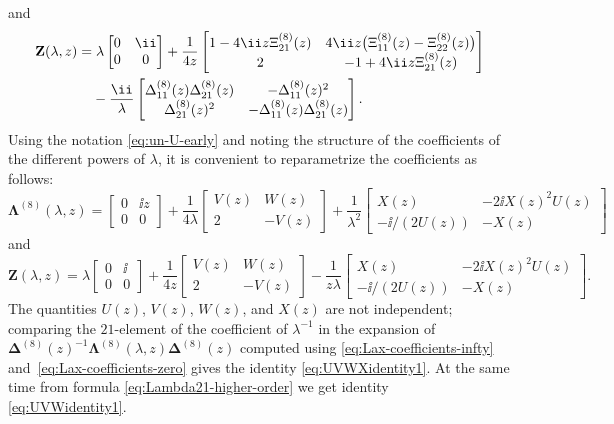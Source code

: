 and
\begin{align*}
 & \mathbf{Z}(\lambda,z)= \lambda\begin{bmatrix}0 & {\ii}{} \\0&0\end{bmatrix}+\frac{1}{4z}\begin{bmatrix}
 1-{4\ii z}{}\Xi^{(8)}_{21}(z) &{4\ii z}{}\big(\Xi^{(8)}_{11}(z)-\Xi^{(8)}_{22}(z)\big) \\2 & -1+{4\ii z}{}\Xi^{(8)}_{21}(z)
 \end{bmatrix} \\
 &\hphantom{\mathbf{Z}(\lambda,z)=}{} -
 \frac{\ii }{ \lambda}\begin{bmatrix}\Delta^{(8)}_{11}(z)\Delta^{(8)}_{21}(z) & -\Delta^{(8)}_{11}(z)^2 \\
 \Delta^{(8)}_{21}(z)^2 & -\Delta^{(8)}_{11}(z)\Delta^{(8)}_{21}(z)\end{bmatrix}.
\end{align*}
Using the notation \eqref{eq:un-U-early} and noting the structure of the coefficients of the different powers of $\lambda$, it is convenient to reparametrize the coefficients as follows:
\begin{equation*}
 \mathbf{\Lambda}^{(8)}(\lambda,z)=\begin{bmatrix}0&{\ii z}{} \\0&0\end{bmatrix} +\frac{1}{4\lambda}\begin{bmatrix}V(z) & W(z)\\2 & -V(z)\end{bmatrix} +\frac{1}{\lambda^2}\begin{bmatrix} X(z) & -2 \ii X(z)^2U(z)\\-\ii/(2U(z)) & -X(z)\end{bmatrix}
\end{equation*}
and
\begin{equation*} \mathbf{Z}(\lambda,z)=\lambda\begin{bmatrix}0&{\ii}{} \\0&0\end{bmatrix} + \frac{1}{4z}\begin{bmatrix}V(z) & W(z)\\2 & -V(z)\end{bmatrix}-\frac{1}{z\lambda}\begin{bmatrix}X(z) & -2\ii X(z)^2U(z)\\-\ii/(2U(z)) & -X(z)\end{bmatrix}.
\end{equation*}
The quantities $U(z)$, $V(z)$, $W(z)$, and $X(z)$ are not independent; comparing the $21$-element of the coefficient of $\lambda^{-1}$ in the expansion of $\mathbf{\Delta}^{(8)}(z)^{-1}\mathbf{\Lambda}^{(8)}(\lambda,z)\mathbf{\Delta}^{(8)}(z)$ computed using \eqref{eq:Lax-coefficients-infty} and~\eqref{eq:Lax-coefficients-zero} gives the identity \eqref{eq:UVWXidentity1}.
At the same time from formula \eqref{eq:Lambda21-higher-order} we get identity \eqref{eq:UVWidentity1}.


